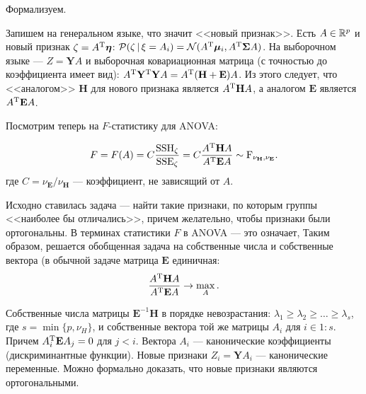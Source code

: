 Формализуем.

Запишем на генеральном языке, что значит <<новый признак>>. Есть $A \in \mathbb{R}^p$ и новый признак
$\zeta = A^{\mathrm{T}} \bm\eta$: $\mathcal P(\zeta \, | \, \xi = A_i) = \mathcal N(A^{\mathrm{T}} \bm\mu_i, A^{\mathrm{T}} \bm\Sigma A)$.
На выборочном языке --- $Z = \mathbf Y A$ и выборочная ковариационная матрица (с точностью до коэффициента имеет вид):
$A^{\mathrm{T}} \mathbf Y^{\mathrm{T}} \mathbf Y A = A^{\mathrm{T}} ( \mathbf H + \mathbf E ) A$. Из этого следует, %
что <<аналогом>> $\mathbf H$ для
нового признака является $A^{\mathrm{T}} \mathbf H A$, а аналогом $\mathbf E$ является $A^{\mathrm{T}} \mathbf E A$.

Посмотрим теперь на $F$-статистику для ANOVA:

\begin{gather*}
    F = F(A) = C \frac{\mathrm{SSH}_\zeta}{\mathrm{SSE_\zeta}} = C \frac{A^{\mathrm{T}} \mathbf H A}{A^{\mathrm{T}} \mathbf E A} \sim
    \mathrm F_{\nu_\mathbf H, \nu_\mathbf E}.
\end{gather*}
где $C = \nu_\mathbf E / \nu_\mathbf H$ --- коэффициент, не зависящий от $A$.

Исходно ставилась задача --- найти такие признаки, по которым группы <<наиболее бы отличались>>, причем желательно, чтобы признаки были ортогональны.
В терминах статистики $F$ в ANOVA --- это означает, %
Таким образом, решается обобщенная задача на собственные числа и собственные вектора (в обычной задаче матрица $\mathbf E$ единичная:
\begin{gather*}
    \frac{A^{\mathrm{T}} \mathbf H A}{A^{\mathrm{T}} \mathbf E A} \rightarrow \max_A.
\end{gather*}

Собственные числа матрицы $\mathbf E^{-1} \mathbf H$ в порядке невозрастания: $\lambda_1 \geqslant \lambda_2 \geqslant \ldots
\geqslant \lambda_s$, где $s = \min\{p, \nu_H\}$, и собственные вектора той же матрицы $A_i$ для $i \in 1:s$.
Причем $A_i^{\mathrm{T}} \mathbf E A_j = 0$ для $j < i$.
Вектора $A_i$ --- канонические коэффициенты (дискриминантные функции). Новые признаки $Z_i = \mathbf Y A_i$ --- канонические переменные.
Можно формально доказать, что новые признаки являются ортогональными.

